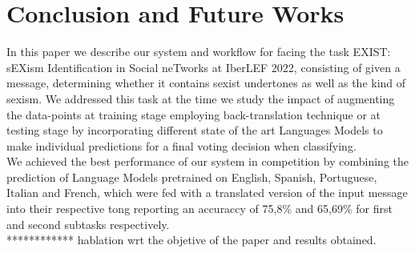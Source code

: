 \documentclass[
]{ceurart}
\begin{document}
\section{Conclusion and Future Works}

In this paper we describe our system and workflow for facing the task EXIST: sEXism Identification in Social neTworks at IberLEF 2022, consisting of given a message, determining whether it contains sexist undertones as well as the kind of sexism. We addressed this task at the time we study the impact of augmenting the data-points at training stage employing back-translation technique or at testing stage by incorporating different state of the art Languages Models to make individual predictions for a final voting decision when classifying.
\\
We achieved the best performance of our system in competition by combining the prediction of Language Models pretrained on English, Spanish, Portuguese, Italian and French, which were fed with a translated version of the input message into their respective tong reporting an accuraccy of 75,8\% and  65,69\% for first and second subtasks respectively.\\
************ hablation wrt the objetive of the paper and results obtained.
\begin{acknowledgments}
	
\end{acknowledgments}


\end{document}
